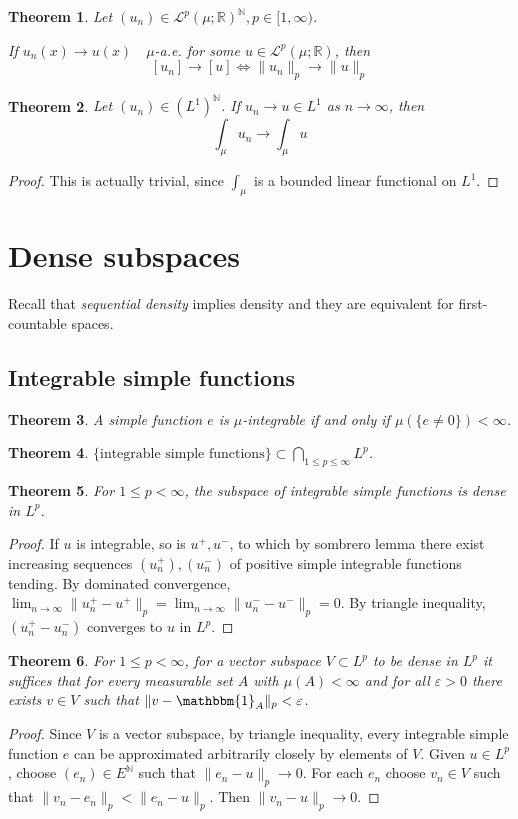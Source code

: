 \documentclass[11pt, a4paper, openany]{book}
\newtheorem{thm}{Theorem}\newtheorem{lem}{Lemma}\newtheorem{crl}{Corollary}
\theoremstyle{definition}
\begin{document}
    \begin{thm}
        Let $(u_n)\in \mathcal{L}^p(\mu;\mathbb{R})^\mathbb{N}, p\in[1,\infty)$. 
        \par If $u_n(x)\to u(x)\quad\mu$-a.e. for some $u\in \mathcal{L}^p(\mu;\mathbb{R})$, then
        \[[u_n]\to [u]\Longleftrightarrow \|u_n\|_p\to\|u\|_p\]
    \end{thm}
    \begin{thm}
        Let $(u_n)\in (L^1)^\mathbb{N}$. If $u_n\to u\in L^1$ as $n\to\infty$, then
        \[
            \int_\mu u_n\to\int_\mu u
        \]
    \end{thm}
    \begin{proof}
        This is actually trivial, since $\int_\mu$ is a bounded linear functional on $L^1$.
    \end{proof}
\section{Dense subspaces}
    Recall that \textit{sequential density} implies density and they are equivalent for first-countable spaces.
\subsection{Integrable simple functions}
    \begin{thm}
        A simple function $e$ is $\mu$-integrable if and only if $\mu(\{e\neq 0\})<\infty$.
    \end{thm}
    \begin{thm}
        $\{\text{integrable simple functions}\}\subset \bigcap_{1\leqslant p\leqslant \infty}L^p$.
    \end{thm}
    \begin{thm}
        For $1\leqslant p<\infty$, the subspace of integrable simple functions is dense in $L^p$.
    \end{thm}
    \begin{proof}
        If $u$ is integrable, so is $u^+,u^-$, to which by sombrero lemma there exist increasing sequences $(u^+_n),(u^-_n)$ of positive simple integrable functions tending. By dominated convergence, $\lim_{n\to\infty}\|u^+_n-u^+\|_p=\lim_{n\to\infty}\|u^-_n-u^-\|_p=0$. By triangle inequality, $(u_n^+-u_n^-)$ converges to $u$ in $L^p$.
    \end{proof}
    \begin{thm}
        For $1\leqslant p<\infty$, for a vector subspace $V\subset L^p$ to be dense in $L^p$ it suffices that for every measurable set $A$ with $\mu(A)<\infty$ and for all $\varepsilon>0$ there exists $v\in V$ such that $\|v-\mathbbm{1}_A\|_p<\varepsilon$.
    \end{thm}
    \begin{proof}
        Since $V$ is a vector subspace, by triangle inequality, every integrable simple function $e$ can be approximated arbitrarily closely by elements of $V$. Given $u\in L^p$, choose $(e_n)\in E^\mathbb{N}$ such that $\|e_n- u\|_p\to 0$. For each $e_n$ choose $v_n\in V$ such that $\|v_n-e_n\|_p<\|e_n- u\|_p$. Then $\|v_n-u\|_p\to 0$.
    \end{proof}
\end{document}
